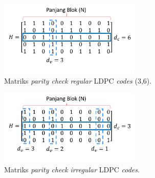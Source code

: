 \begin{figure}
	\centering
	\includegraphics[width=0.6\textwidth]
		{pics/diagram/ldpc.png}
		\caption{Matriks \textit{parity check} \textit{regular} LDPC \textit{codes} (3,6).}
	\label{fig:Regular LDPC codes (3,6)}
\end{figure}
\begin{figure}
	\centering
	\includegraphics[width=0.6\textwidth]
		{pics/diagram/irre.png}
		\caption{Matriks \textit{parity check} \textit{irregular} LDPC \textit{codes}.}
	\label{fig:Irregular LDPC codes}
\end{figure}
